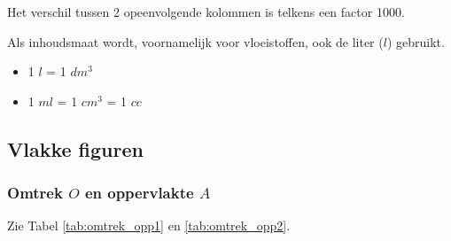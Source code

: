 \begin{opmerking}
	Het verschil tussen 2 opeenvolgende kolommen is telkens een factor 1000.
\end{opmerking}

Als inhoudsmaat wordt, voornamelijk voor vloeistoffen, ook de liter ($l$) gebruikt.

\begin{itemize}
	\item 1 $l$ = 1 $dm^3$
	\item 1 $ml$ = 1 $cm^3$ = 1 $cc$
\end{itemize}

\subsection{Vlakke figuren}
\subsubsection{Omtrek $O$ en oppervlakte $A$}
Zie Tabel \ref{tab:omtrek_opp1} en \ref{tab:omtrek_opp2}.

